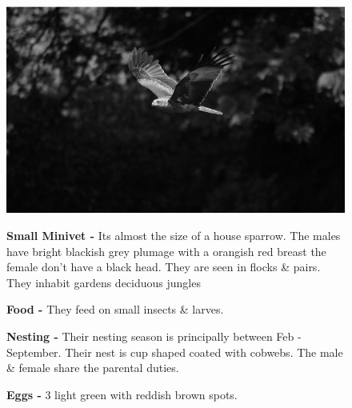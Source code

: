 \begin{figure}[H]
\begin{center}
\includegraphics{figure/Land_birds/01_pariah_kite/pariah-kite.eps}
\end{center}
\medskip
\noindent
{\bf Small Minivet -} Its almost the size of a house sparrow. The males have bright blackish grey plumage with a orangish red breast the female don't have a black head. They are seen in flocks \& pairs. They inhabit gardens deciduous jungles

\medskip
{\bf Food -} They feed on small insects \& larves.

{\bf Nesting -} Their nesting season is principally between Feb - September. Their nest is cup shaped coated with cobwebs. The male \& female share the parental duties.

{\bf Eggs -} 3 light green with reddish brown spots.
\end{figure}

\vfill\eject

~\phantom{a}
\vfill

